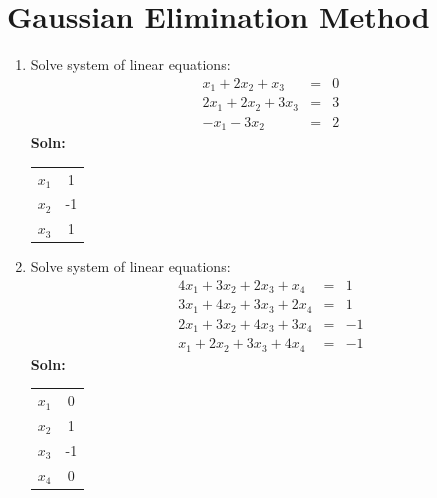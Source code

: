 \documentclass[12,a4paper]{article}
\begin{document}
    \section{Gaussian Elimination Method}
    \begin{enumerate}
        \item Solve system of linear equations:
            \begin{eqnarray*}
                x_1 + 2x_2 + x_3 &=& 0 \\
                2x_1 + 2x_2 + 3x_3 &=& 3 \\
                -x_1 - 3x_2 &=& 2
            \end{eqnarray*}
            \textbf{Soln:}\\
            \begin{table}[H]
                \centering
                \begin{tabular}{|c|c|}
                    \hline
                    $x_1$ & 1 \\
                    $x_2$ & -1 \\
                    $x_3$ & 1 \\
                    \hline 
                \end{tabular}
            \end{table}

        \item Solve system of linear equations:
            \begin{eqnarray*}
                4x_1 + 3x_2 + 2x_3 + x_4 &=& 1 \\
                3x_1 + 4x_2 + 3x_3 + 2x_4 &=& 1 \\
                2x_1 + 3x_2 + 4x_3 + 3x_4 &=& -1 \\
                x_1 + 2x_2 + 3x_3 + 4x_4 &=& -1 
            \end{eqnarray*}
            \textbf{Soln:}\\
            \begin{table}[H]
                \centering
                \begin{tabular}{|c|c|}
                    \hline
                    $x_1$ &  0\\
                    $x_2$ &  1\\
                    $x_3$ &  -1\\
                    $x_4$ & 0\\ 
                    \hline
                \end{tabular}
            \end{table}


\end{enumerate}
\end{document}
